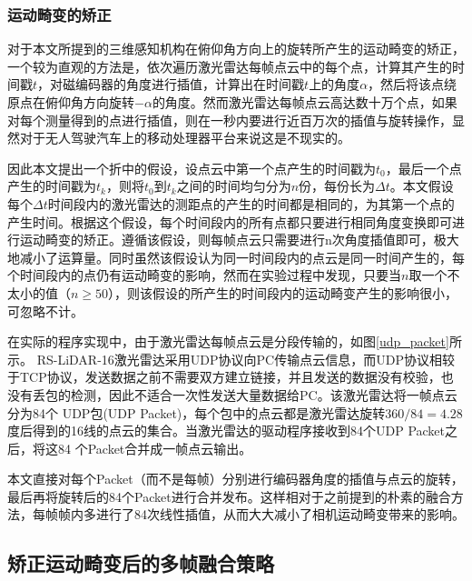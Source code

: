 \subsubsection{运动畸变的矫正}

对于本文所提到的三维感知机构在俯仰角方向上的旋转所产生的运动畸变的矫正，一个较为直观的方法是，依次遍历激光雷达每帧点云中的每个点，计算其产生的时间戳$t$，对磁编码器的角度进行插值，计算出在时间戳$t$上的角度$\alpha$，然后将该点绕原点在俯仰角方向旋转$-\alpha$的角度。然而激光雷达每帧点云高达数十万个点，如果对每个测量得到的点进行插值，则在一秒内要进行近百万次的插值与旋转操作，显然对于无人驾驶汽车上的移动处理器平台来说这是不现实的。

因此本文提出一个折中的假设，设点云中第一个点产生的时间戳为$t_0$，最后一个点产生的时间戳为$t_k$，则将$t_0$到$t_k$之间的时间均匀分为$n$份，每份长为$\Delta t$。本文假设每个$\Delta t$时间段内的激光雷达的测距点的产生的时间都是相同的，为其第一个点的产生时间。根据这个假设，每个时间段内的所有点都只要进行相同角度变换即可进行运动畸变的矫正。遵循该假设，则每帧点云只需要进行n次角度插值即可，极大地减小了运算量。同时虽然该假设认为同一时间段内的点云是同一时间产生的，每个时间段内的点仍有运动畸变的影响，然而在实验过程中发现，只要当$n$取一个不太小的值（$n\geq 50$），则该假设的所产生的时间段内的运动畸变产生的影响很小，可忽略不计。

在实际的程序实现中，由于激光雷达每帧点云是分段传输的，如图\ref{udp_packet}所示。
RS-LiDAR-16激光雷达采用UDP协议向PC传输点云信息，而UDP协议相较于TCP协议，发送数据之前不需要双方建立链接，并且发送的数据没有校验，也没有丢包的检测，因此不适合一次性发送大量数据给PC。该激光雷达将一帧点云分为84个 UDP包(UDP Packet)，每个包中的点云都是激光雷达旋转$360 / 84 = 4.28$度后得到的16线的点云的集合。当激光雷达的驱动程序接收到84个UDP Packet之后，将这84 个Packet合并成一帧点云输出。

本文直接对每个Packet（而不是每帧）分别进行编码器角度的插值与点云的旋转，最后再将旋转后的84个Packet进行合并发布。这样相对于之前提到的朴素的融合方法，每帧帧内多进行了84次线性插值，从而大大减小了相机运动畸变带来的影响。

\subsection{矫正运动畸变后的多帧融合策略}

